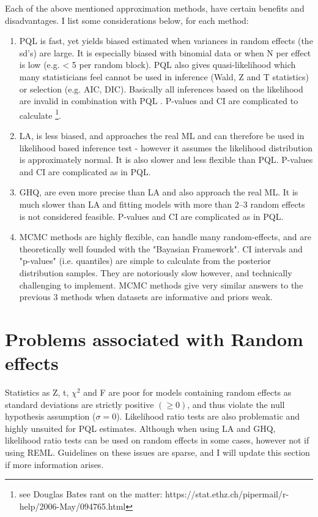 \documentclass{article}\usepackage[]{graphicx}\usepackage[]{color}
\numberwithin{equation}{section} %
\numberwithin{figure}{section} %
\numberwithin{table}{section} %
\begin{document}
Each of the above mentioned approximation methods, have certain benefits and disadvantages. I list some considerations below, for each method:

\begin{enumerate}
\item PQL is fast, yet yields biased estimated when variances in random effects (the sd's) are large. It is especially biased with binomial data or when N per effect is low (e.g. < 5 per random block). PQL also gives quasi-likelihood which many statisticians feel cannot be used in inference (Wald, Z and T statistics) or selection (e.g. AIC, DIC). Basically all inferences based on the likelihood are invalid in combination with PQL \citep{Joe2008}. P-values and CI are complicated to calculate \footnote{see Douglas Bates rant on the matter: https://stat.ethz.ch/pipermail/r-help/2006-May/094765.html}.
\item LA, is less biased, and approaches the real ML and can therefore be used in likelihood based inference test - however it assumes the likelihood distribution is approximately normal. It is also slower and less flexible than PQL. P-values and CI are complicated as in PQL.
\item GHQ, are even more precise than LA and also approach the real ML. It is much slower than LA and fitting models with more than 2–3 random effects is not considered feasible. P-values and CI are complicated as in PQL.
\item MCMC methods are highly flexible, can handle many random-effects, and are theoretically well founded with the "Bayasian Framework". CI intervals and "p-values" (i.e. quantiles) are simple to calculate from the posterior distribution samples. They are notoriously slow however, and technically challenging to implement. MCMC methods give very similar answers to the previous 3 methods when datasets are informative and priors weak.
\end{enumerate}

\section{Problems associated with Random effects}

Statistics as Z, t, $\chi^2$ and F are poor for models containing random effects as standard deviations are strictly positive $(\geq 0)$, and thus violate the null hypothesis assumption ($\sigma = 0$). Likelihood ratio tests are also problematic and highly unsuited for PQL estimates. Although when using LA and GHQ, likelihood ratio tests can be used on random effects in some cases, however not if using REML. Guidelines on these issues are sparse, and I will update this section if more information arises.
\end{document}
